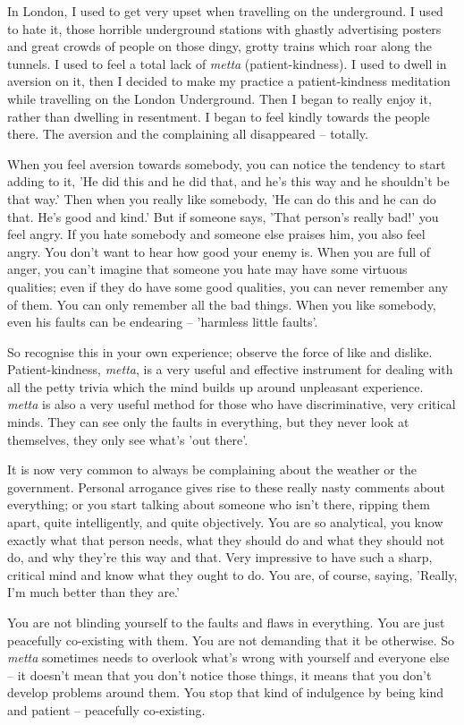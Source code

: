 In London, I used to get very upset when travelling on the underground. I used to hate it, those horrible underground stations with ghastly advertising posters and great crowds of people on those dingy, grotty trains which roar along the tunnels. I used to feel a total lack of \textit{metta} (patient-kindness). I used to dwell in aversion on it, then I decided to make my practice a patient-kindness meditation while travelling on the London Underground. Then I began to really enjoy it, rather than dwelling in resentment. I began to feel kindly towards the people there. The aversion and the complaining all disappeared -- totally.

When you feel aversion towards somebody, you can notice the tendency to start adding to it, 'He did this and he did that, and he's this way and he shouldn't be that way.' Then when you really like somebody, 'He can do this and he can do that. He's good and kind.' But if someone says, 'That person's really bad!' you feel angry. If you hate somebody and someone else praises him, you also feel angry. You don't want to hear how good your enemy is. When you are full of anger, you can't imagine that someone you hate may have some virtuous qualities; even if they do have some good qualities, you can never remember any of them. You can only remember all the bad things. When you like somebody, even his faults can be endearing -- 'harmless little faults'.

So recognise this in your own experience; observe the force of like and dislike. Patient-kindness, \textit{metta}, is a very useful and effective instrument for dealing with all the petty trivia which the mind builds up around unpleasant experience. \textit{metta} is also a very useful method for those who have discriminative, very critical minds. They can see only the faults in everything, but they never look at themselves, they only see what's 'out there'.

It is now very common to always be complaining about the weather or the government. Personal arrogance gives rise to these really nasty comments about everything; or you start talking about someone who isn't there, ripping them apart, quite intelligently, and quite objectively. You are so analytical, you know exactly what that person needs, what they should do and what they should not do, and why they're this way and that. Very impressive to have such a sharp, critical mind and know what they ought to do. You are, of course, saying, 'Really, I'm much better than they are.'

You are not blinding yourself to the faults and flaws in everything. You are just peacefully co-existing with them. You are not demanding that it be otherwise. So \textit{metta} sometimes needs to overlook what's wrong with yourself and everyone else -- it doesn't mean that you don't notice those things, it means that you don't develop problems around them. You stop that kind of indulgence by being kind and patient -- peacefully co-existing.

